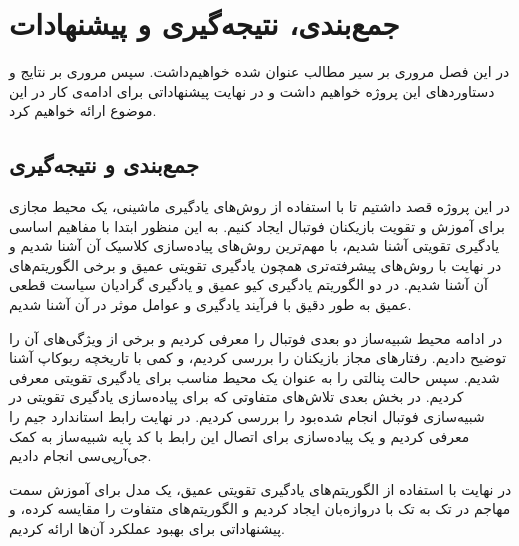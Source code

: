 \chapter{جمع‌بندی، نتیجه‌گیری و پیشنهادات}
در این فصل مروری بر سیر مطالب عنوان شده خواهیم‌داشت.
سپس مروری بر نتایج‌ و دستاورد‌های این پروژه خواهیم داشت و در نهایت پیشنهاداتی برای ادامه‌ی کار در این موضوع ارائه خواهیم کرد.
\section{جمع‌بندی و نتیجه‌گیری}
در این پروژه قصد داشتیم تا با استفاده از روش‌های یادگیری ماشینی، یک محیط مجازی برای آموزش و تقویت بازیکنان فوتبال ایجاد کنیم.
به این منظور ابتدا با مفاهیم اساسی یادگیری تقویتی آشنا شدیم،
با مهم‌ترین روش‌های پیاده‌سازی کلاسیک آن آشنا شدیم و در نهایت با روش‌های پیشرفته‌تری همچون یادگیری تقویتی عمیق و برخی الگوریتم‌های آن آشنا شدیم.
در دو الگوریتم یادگیری کیو عمیق و یادگیری گرادیان سیاست قطعی عمیق به طور دقیق با فرآیند یادگیری و عوامل موثر در آن آشنا شدیم.

در ادامه محیط شبیه‌ساز دو بعدی فوتبال را معرفی کردیم و برخی از ویژگی‌های آن را توضیح دادیم.
رفتار‌های مجاز بازیکنان را بررسی کردیم، و کمی با تاریخچه ربوکاپ آشنا شدیم. سپس حالت پنالتی را به عنوان یک محیط مناسب برای یادگیری تقویتی معرفی کردیم.
در بخش بعدی تلاش‌های متفاوتی که برای پیاده‌سازی یادگیری تقویتی در شبیه‌سازی فوتبال انجام شده‌بود را بررسی کردیم.
در نهایت رابط استاندارد جیم را معرفی کردیم و یک پیاده‌سازی برای اتصال این رابط با کد پایه شبیه‌ساز به کمک جی‌آر‌پی‌سی انجام دادیم.

در نهایت با استفاده از الگوریتم‌های یادگیری تقویتی عمیق، یک مدل برای آموزش سمت مهاجم در تک به تک با دروازه‌بان ایجاد کردیم و الگوریتم‌های متفاوت را مقایسه کرده، و پیشنهاداتی برای بهبود عملکرد آن‌ها ارائه کردیم.
